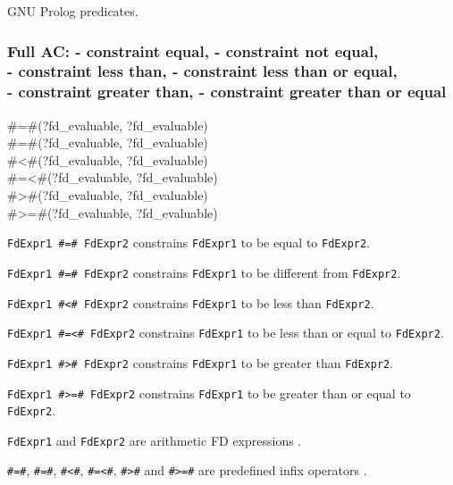 GNU Prolog predicates.

\subsubsection{Full AC:  - constraint equal, \label{Full-AC:-(:=:)/2}
                - constraint not equal, \\
                - constraint less than,
                - constraint less than or equal, \\
                - constraint greater than,
                - constraint greater than or equal}

\begin{TemplatesOneCol}
\#=\#(?fd\_evaluable, ?fd\_evaluable)\\
\#{\bs}=\#(?fd\_evaluable, ?fd\_evaluable)\\
\#<\#(?fd\_evaluable, ?fd\_evaluable)\\
\#=<\#(?fd\_evaluable, ?fd\_evaluable)\\
\#>\#(?fd\_evaluable, ?fd\_evaluable)\\
\#>=\#(?fd\_evaluable, ?fd\_evaluable)

\end{TemplatesOneCol}

\Description

\texttt{FdExpr1 \#=\# FdExpr2} constrains \texttt{FdExpr1} to
be equal to \texttt{FdExpr2}.

\texttt{FdExpr1 \#{\bs}=\# FdExpr2} constrains \texttt{FdExpr1} to be
different from \texttt{FdExpr2}.

\texttt{FdExpr1 \#<\# FdExpr2} constrains \texttt{FdExpr1}
to be less than \texttt{FdExpr2}.

\texttt{FdExpr1 \#=<\# FdExpr2} constrains \texttt{FdExpr1} to be
less than or equal to \texttt{FdExpr2}.

\texttt{FdExpr1 \#>\# FdExpr2} constrains \texttt{FdExpr1}
to be greater than \texttt{FdExpr2}.

\texttt{FdExpr1 \#>=\# FdExpr2} constrains \texttt{FdExpr1} to be
greater than or equal to \texttt{FdExpr2}.

\texttt{FdExpr1} and \texttt{FdExpr2} are arithmetic FD expressions
.

\texttt{\#=\#}, \texttt{\#{\bs}=\#}, \texttt{\#<\#},
\texttt{\#=<\#}, \texttt{\#>\#} and \texttt{\#>=\#} are
predefined infix operators .

